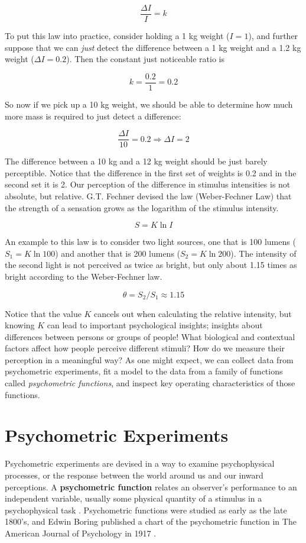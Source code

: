 \documentclass[11pt, oneside, openany]{scrbook}
\begin{document}
\[
\frac{\Delta I}{I} = k
\]

To put this law into practice, consider holding a 1 kg weight (\(I = 1\)), and further suppose that we can \emph{just} detect the difference between a 1 kg weight and a 1.2 kg weight (\(\Delta I = 0.2\)). Then the constant just noticeable ratio is

\[
k = \frac{0.2}{1} = 0.2
\]

So now if we pick up a 10 kg weight, we should be able to determine how much more mass is required to just detect a difference:

\[
\frac{\Delta I}{10} = 0.2 \Rightarrow \Delta I = 2
\]

The difference between a 10 kg and a 12 kg weight should be just barely perceptible. Notice that the difference in the first set of weights is 0.2 and in the second set it is 2. Our perception of the difference in stimulus intensities is not absolute, but relative. G.T. Fechner devised the law (Weber-Fechner Law) that the strength of a sensation grows as the logarithm of the stimulus intensity.

\[S = K \ln I\]

An example to this law is to consider two light sources, one that is 100 lumens (\(S_1 = K \ln 100\)) and another that is 200 lumens (\(S_2 = K \ln 200\)). The intensity of the second light is not perceived as twice as bright, but only about 1.15 times as bright according to the Weber-Fechner law.

\[\theta = S_2 / S_1 \approx 1.15\]

Notice that the value \(K\) cancels out when calculating the relative intensity, but knowing \(K\) can lead to important psychological insights; insights about differences between persons or groups of people! What biological and contextual factors affect how people perceive different stimuli? How do we measure their perception in a meaningful way? As one might expect, we can collect data from psychometric experiments, fit a model to the data from a family of functions called \emph{psychometric functions}, and inspect key operating characteristics of those functions.

\hypertarget{psycho-experiments}{%
\section{Psychometric Experiments}\label{psycho-experiments}}

Psychometric experiments are devised in a way to examine psychophysical processes, or the response between the world around us and our inward perceptions. A \textbf{psychometric function} relates an observer's performance to an independent variable, usually some physical quantity of a stimulus in a psychophysical task \citep{wichmann2001a}. Psychometric functions were studied as early as the late 1800's, and Edwin Boring published a chart of the psychometric function in The American Journal of Psychology in 1917 \citep{boring1917chart}.
\end{document}
